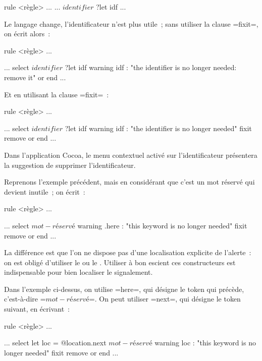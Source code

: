 \begin{galgas}
rule <règle> ... {
  ...
  $identifier$ ?let idf
  ...
}
\end{galgas}

Le langage change, l'identificateur n'est plus utile~; sans utiliser la clause \ggs=fixit=, on écrit alors~:

\begin{galgas}
rule <règle> ... {
  ...
  select
    $identifier$ ?let idf
    warning idf : "the identifier is no longer needed: remove it"
  or
  end
  ...
  
}
\end{galgas}


Et en utilisant la clause \ggs=fixit=~:

\begin{galgas}
rule <règle> ... {
  ...
  select
    $identifier$ ?let idf
    warning idf : "the identifier is no longer needed" fixit { remove }
  or
  end
  ...
  
}
\end{galgas}

Dans l'application Cocoa, le menu contextuel activé sur l'identificateur présentera la suggestion de supprimer l'identificateur.



Reprenons l'exemple précédent, mais en considérant que c'est un mot réservé qui devient inutile~; on écrit~:

\begin{galgas}
rule <règle> ... {
  ...
  select
    $mot-réservé$
    warning .here : "this keyword is no longer needed" fixit { remove }
  or
  end
  ...
  
}
\end{galgas}

La différence est que l'on ne dispose pas d'une localisation explicite de l'alerte~: on est obligé d'utiliser le  ou le . Utiliser à bon escient ces constructeurs est indispensable pour bien localiser le signalement.

Dans l'exemple ci-dessus, on utilise \ggs=here=, qui désigne le token qui précède, c'est-à-dire \ggs=$mot-réservé$=. On peut utiliser \ggs=next=, qui désigne le token suivant, en écrivant~:

\begin{galgas}
rule <règle> ... {
  ...
  select
    let loc = @location.next
    $mot-réservé$
    warning loc : "this keyword is no longer needed" fixit { remove }
  or
  end
  ...
  
}
\end{galgas}


